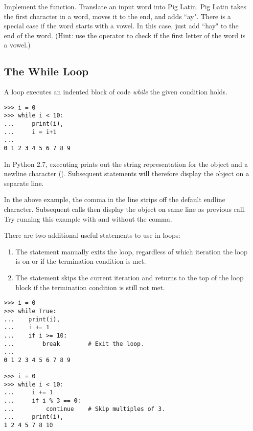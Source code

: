 \begin{problem}
Implement the  function.
Translate an input word into Pig Latin.
Pig Latin takes the first character in a word, moves it to the end, and adds ``ay".
There is a special case if the word starts with a vowel.
In this case, just add ``hay" to the end of the word.
(Hint: use the  operator to check if the first letter of the word is a vowel.)
\end{problem}

\subsection*{The While Loop}
A  loop executes an indented block of code \emph{while} the given condition holds. 

\begin{lstlisting}
>>> i = 0
>>> while i < 10:        
...     print(i),            
...     i = i+1
...     
0 1 2 3 4 5 6 7 8 9
\end{lstlisting}

\begin{info} %
In Python 2.7, executing  prints out the string representation for the object  and a newline character (\li{\n}).
Subsequent  statements will therefore display the object on a separate line.

In the above example, the comma in the line  strips off the default endline character.
Subsequent calls then display the object on same line as previous call.
Try running this example with and without the comma.
\end{info}

There are two additional useful statements to use in loops:
\begin{enumerate}
\item The  statement manually exits the loop, regardless of which iteration the loop is on or if the termination condition is met.
\item The  statement skips the current iteration and returns to the top of the loop block if the termination condition is still not met.
\end{enumerate}

\begin{lstlisting}
>>> i = 0
>>> while True:
...    print(i),
...    i += 1
...    if i >= 10:
...        break        # Exit the loop.
...
0 1 2 3 4 5 6 7 8 9

>>> i = 0
>>> while i < 10:
...     i += 1
...     if i % 3 == 0:
...         continue    # Skip multiples of 3.
...     print(i),
1 2 4 5 7 8 10

\end{lstlisting}

